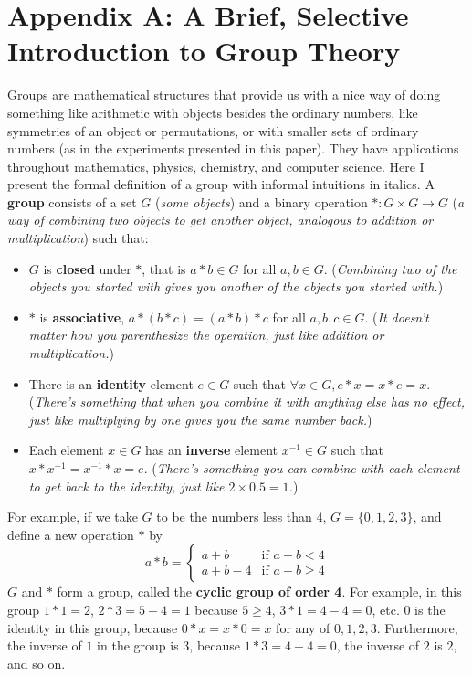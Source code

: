 \documentclass[man,10pt]{apa6}
\begin{document}
\section{Appendix A: A Brief, Selective Introduction to Group Theory}
Groups are mathematical structures that provide us with a nice way of doing something like arithmetic with objects besides the ordinary numbers, like symmetries of an object or permutations, or with smaller sets of ordinary numbers (as in the experiments presented in this paper). They have applications throughout mathematics, physics, chemistry, and computer science. Here I present the formal definition of a group with informal intuitions in italics. A \textbf{group} consists of a set $G$ (\emph{some objects}) and a binary operation $*: G\times G \rightarrow G$ (\emph{a way of combining two objects to get another object, analogous to addition or multiplication}) such that:  
\begin{itemize}
\item $G$ is \textbf{closed} under $*$, that is $a*b \in G$ for all $a,b \in G$. (\emph{Combining two of the objects you started with gives you another of the objects you started with.}) 
\item $*$ is \textbf{associative}, $a*(b*c) = (a*b)*c$ for all $a,b,c \in G$. (\emph{It doesn't matter how you parenthesize the operation, just like addition or multiplication.})
\item There is an \textbf{identity} element $e \in G$ such that $\forall x \in G, e*x = x*e = x$. (\emph{There's something that when you combine it with anything else has no effect, just like multiplying by one gives you the same number back.})
\item Each element $x \in G$ has an \textbf{inverse} element $x^{-1} \in G$ such that $x*x^{-1} = x^{-1}*x = e$. (\emph{There's something you can combine with each element to get back to the identity, just like $2 \times 0.5 = 1$.})
\end{itemize}
For example, if we take $G$ to be the numbers less than $4$, $G = \{0,1,2,3\}$, and define a new operation $*$ by $$a*b = \begin{cases} a+b & \text{if } a+b < 4 \\ a+b-4 & \text{if } a+b \geq 4 \end{cases}$$
$G$ and $*$ form a group, called the \textbf{cyclic group of order 4}. For example, in this group $1*1 = 2$, $2 * 3 = 5-4 = 1$ because $5 \geq 4$, $3*1 = 4-4 = 0$, etc. $0$ is the identity in this group, because $0*x = x*0 = x$ for any of $0,1,2,3$. Furthermore, the inverse of $1$ in the group is $3$, because $1*3 = 4-4 = 0$, the inverse of $2$ is $2$, and so on.\par
\end{document}
